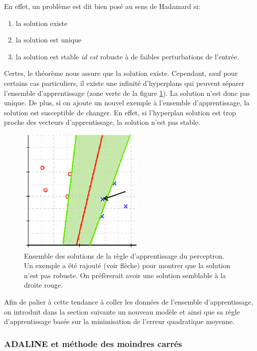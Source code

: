 En effet, un problème est dit bien posé au sens de Hadamard si:

\begin{enumerate}
\item la solution existe
\item la solution est unique
\item la solution est stable \textit{id est} robuste à de faibles perturbations de l'entrée.
\end{enumerate}

Certes, le théorème nous assure que la solution existe. Cependant, sauf pour
certains cas particuliers, il existe une infinité d'hyperplans qui peuvent
séparer l'ensemble d'apprentissage (zone verte de la figure
\ref{fig:percep_g}). La solution n'est donc pas unique. De plus, si on ajoute
un nouvel exemple à l'ensemble d'apprentissage, la solution est susceptible de
changer. En effet, si l'hyperplan solution est trop proche des vecteurs
d'apprentissage, la solution n'est pas stable.

\begin{figure}[!h]
\begin{center}
\includegraphics[width=6cm]{predoc/images/percep_graph2.eps}
\end{center}
\caption{\label{fig:percep_g} Ensemble des solutions de la règle d'apprentissage du perceptron. Un exemple a été rajouté (voir flèche) pour montrer que la solution n'est pas robuste. On préfèrerait avoir une solution semblable à la droite rouge.}
\end{figure}

Afin de palier à cette tendance à coller les données de l'ensemble
d'apprentissage, on introduit dans la section suivante un nouveau modèle et
ainsi que sa règle d'apprentissage basée sur la minimisation de l'erreur
quadratique moyenne.

\subsubsection{ADALINE et méthode des moindres carrés\label{adaline}}

